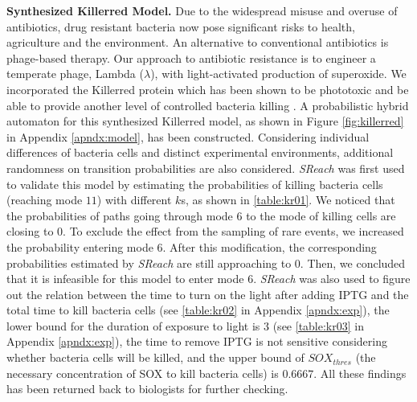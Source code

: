 \vspace{-.1cm}

{\bf Synthesized Killerred Model.} Due to the widespread misuse and overuse of antibiotics, drug resistant bacteria now pose significant risks to health, agriculture and the environment. An alternative to conventional antibiotics is phage-based therapy. Our approach to antibiotic resistance is to engineer a temperate phage, Lambda ($\lambda$), with light-activated production of superoxide. We incorporated the Killerred protein which has been shown to be phototoxic and be able to provide another level of controlled bacteria killing \cite{natasa2014killerred}. A probabilistic hybrid automaton for this synthesized Killerred model, as shown in Figure \ref{fig:killerred} in Appendix \ref{apndx:model}, has been constructed. Considering individual differences of bacteria cells and distinct experimental environments, additional randomness on transition probabilities are also considered. {\it SReach} was first used to validate this model by estimating the probabilities of killing bacteria cells (reaching mode $11$) with different $k$s, as shown in \ref{table:kr01}. We noticed that the probabilities of paths going through mode $6$ to the mode of killing cells are closing to $0$. To exclude the effect from the sampling of rare events, we increased the probability entering mode $6$. After this modification, the corresponding probabilities estimated by {\it SReach} are still approaching to $0$. Then, we concluded that it is infeasible for this model to enter mode $6$. {\it SReach} was also used to figure out the relation between the time to turn on the light after adding IPTG and the total time to kill bacteria cells (see \ref{table:kr02} in Appendix \ref{apndx:exp}), the lower bound for the duration of exposure to light is $3$ (see \ref{table:kr03} in Appendix \ref{apndx:exp}), the time to remove IPTG is not sensitive considering whether bacteria cells will be killed, and the upper bound of $SOX_{thres}$ (the necessary concentration of SOX to kill bacteria cells) is $0.6667$. All these findings has been returned back to biologists for further checking.

